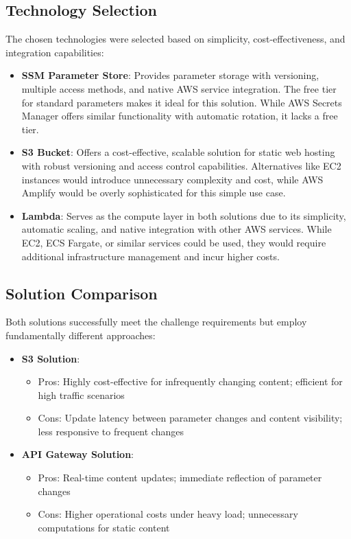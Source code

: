 \documentclass{article}
\begin{document}
\subsection{Technology Selection}

The chosen technologies were selected based on simplicity, cost-effectiveness, and integration capabilities:

\begin{itemize}
    \item \textbf{SSM Parameter Store}: Provides parameter storage with versioning, multiple access methods, and native AWS service integration. The free tier for standard parameters makes it ideal for this solution. While AWS Secrets Manager offers similar functionality with automatic rotation, it lacks a free tier.
    
    \item \textbf{S3 Bucket}: Offers a cost-effective, scalable solution for static web hosting with robust versioning and access control capabilities. Alternatives like EC2 instances would introduce unnecessary complexity and cost, while AWS Amplify would be overly sophisticated for this simple use case.
    
    \item \textbf{Lambda}: Serves as the compute layer in both solutions due to its simplicity, automatic scaling, and native integration with other AWS services. While EC2, ECS Fargate, or similar services could be used, they would require additional infrastructure management and incur higher costs.
\end{itemize}

\subsection{Solution Comparison}

Both solutions successfully meet the challenge requirements but employ fundamentally different approaches:

\begin{itemize}
    \item \textbf{S3 Solution}:
    \begin{itemize}
        \item Pros: Highly cost-effective for infrequently changing content; efficient for high traffic scenarios
        \item Cons: Update latency between parameter changes and content visibility; less responsive to frequent changes
    \end{itemize}
    
    \item \textbf{API Gateway Solution}:
    \begin{itemize}
        \item Pros: Real-time content updates; immediate reflection of parameter changes
        \item Cons: Higher operational costs under heavy load; unnecessary computations for static content
    \end{itemize}
\end{itemize}
\end{document}
